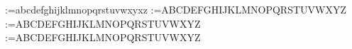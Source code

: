 
\newcommand{\tensor}[1]{\ensuremath{ {\sf #1}\hspace{-0.24659cm} {\sf #1} }}




\makeatletter
\@tfor\next:=abcdefghijklmnopqrstuvwxyxz\do
{\begingroup\edef\x{\endgroup
        \noexpand{}%
    }\x}
%
\@tfor\next:=ABCDEFGHIJKLMNOPQRSTUVWXYZ\do
{\begingroup\edef\x{\endgroup
        \noexpand{}%
    }\x}
%
\@tfor\next:=ABCDEFGHIJKLMNOPQRSTUVWXYZ\do
{\begingroup\edef\x{\endgroup
        \noexpand{}%
    }\x}
%
%
\@tfor\next:=ABCDEFGHIJKLMNOPQRSTUVWXYZ\do
{\begingroup\edef\x{\endgroup
        \noexpand\@namedef{t\next}{\noexpand\tensor{\next}}%
    }\x}
\makeatother


\def\sG{\mathcal{G}}                                %

\newcommand{\Transpose}{\ensuremath{{\!\top}} }     %
\let\T\Transpose


\newcommand{\opt}{\ensuremath{\textsc{Opt}}}

\newcommand{\norm}[1]{\ensuremath{\left\|#1 \right\|}}

\newcommand{\eyes}{\ensuremath{{\mathbf{I}}}}

\newcommand{\1}{{\mathbbm{1}}}           
                                                



\newcommand{\bcdot}{\raisebox{1pt}{\textbf{\large .}}}
%

\newcommand{\sdot}{\raisebox{1pt}{{.}}}



\noexpandarg
\newcommand\col[1]{%
\StrBefore{#1}{_}[\matrix]%
\StrBehind{#1}{_}[\colindex]%
{\ensuremath{{\matrix}_{ \bcdot    \mkern-1.5mu    \colindex}}}%
}

\noexpandarg
\newcommand\row[1]{%
\StrBefore{#1}{_}[\matrix]%
\StrBehind{#1}{_}[\rowindex]%
{\ensuremath{{\matrix}_{ \rowindex  \bcdot }^\T}}%
}

\noexpandarg
{}






